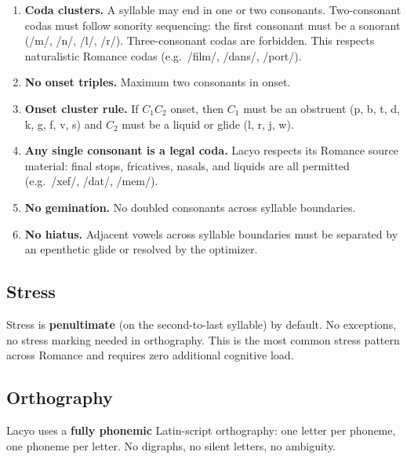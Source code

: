\documentclass[12pt]{book}
\begin{document}
\begin{enumerate}
  \item \textbf{Coda clusters.} A syllable may end in one or two consonants.
        Two-consonant codas must follow sonority sequencing: the first consonant
        must be a sonorant (/m/, /n/, /l/, /r/). Three-consonant codas are
        forbidden. This respects naturalistic Romance codas (e.g.\ /film/,
        /dans/, /port/).
  \item \textbf{No onset triples.} Maximum two consonants in onset.
  \item \textbf{Onset cluster rule.} If $C_1 C_2$ onset, then $C_1$ must be
        an obstruent (p, b, t, d, k, g, f, v, s) and $C_2$ must be a
        liquid or glide (l, r, j, w).
  \item \textbf{Any single consonant is a legal coda.} Lacyo respects its
        Romance source material: final stops, fricatives, nasals, and
        liquids are all permitted (e.g.\ /xef/, /dat/, /mem/).
  \item \textbf{No gemination.} No doubled consonants across syllable boundaries.
  \item \textbf{No hiatus.} Adjacent vowels across syllable boundaries must be
        separated by an epenthetic glide or resolved by the optimizer.
\end{enumerate}

\subsection{Stress}

Stress is \textbf{penultimate} (on the second-to-last syllable) by default.
No exceptions, no stress marking needed in orthography. This is the most
common stress pattern across Romance and requires zero additional cognitive
load.

\subsection{Orthography}

Lacyo uses a \textbf{fully phonemic} Latin-script orthography: one letter
per phoneme, one phoneme per letter. No digraphs, no silent letters,
no ambiguity.
\end{document}
